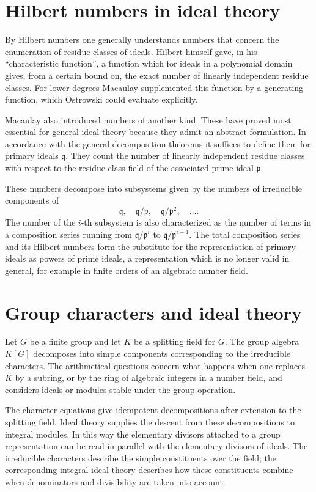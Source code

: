 \documentclass[11pt]{article}
\begin{document}
\section{Hilbert numbers in ideal theory}

By Hilbert numbers one generally understands numbers that concern the enumeration of residue classes of ideals. Hilbert himself gave, in his ``characteristic function'', a function which for ideals in a polynomial domain gives, from a certain bound on, the exact number of linearly independent residue classes. For lower degrees Macaulay supplemented this function by a generating function, which Ostrowski could evaluate explicitly.

Macaulay also introduced numbers of another kind. These have proved most essential for general ideal theory because they admit an abstract formulation. In accordance with the general decomposition theorems it suffices to define them for primary ideals $\mathfrak q$. They count the number of linearly independent residue classes with respect to the residue-class field of the associated prime ideal $\mathfrak p$.

These numbers decompose into subsystems given by the numbers of irreducible components of
\[
  \mathfrak q,
  \quad \mathfrak q/\mathfrak p,
  \quad \mathfrak q/\mathfrak p^2,
  \quad \ldots .
\]
The number of the $i$-th subsystem is also characterized as the number of terms in a composition series running from $\mathfrak q/\mathfrak p^i$ to $\mathfrak q/\mathfrak p^{i-1}$. The total composition series and its Hilbert numbers form the substitute for the representation of primary ideals as powers of prime ideals, a representation which is no longer valid in general, for example in finite orders of an algebraic number field.

\section{Group characters and ideal theory}

Let $G$ be a finite group and let $K$ be a splitting field for $G$. The group algebra $K[G]$ decomposes into simple components corresponding to the irreducible characters. The arithmetical questions concern what happens when one replaces $K$ by a subring, or by the ring of algebraic integers in a number field, and considers ideals or modules stable under the group operation.

The character equations give idempotent decompositions after extension to the splitting field. Ideal theory supplies the descent from these decompositions to integral modules. In this way the elementary divisors attached to a group representation can be read in parallel with the elementary divisors of ideals. The irreducible characters describe the simple constituents over the field; the corresponding integral ideal theory describes how these constituents combine when denominators and divisibility are taken into account.
\end{document}
